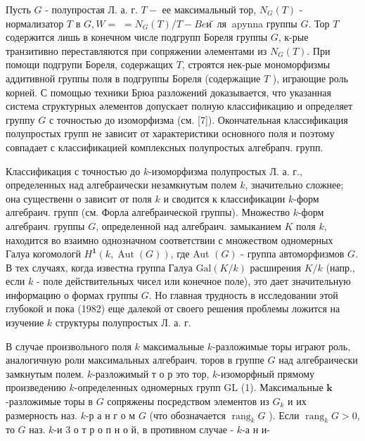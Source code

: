 \documentclass[10pt]{article}
\begin{document}
Пусть $G$ - полупростая Л. а. г. $T-$ ее максимальный тор, $N_{G}(T)$ - нормализатор $T$ в $G, W=$ $=N_{G}(T) / T-B e и ̆ л я ~$ apynna группы $G$. Тор $T$ содержится лишь в конечном числе подгрупп Бореля группы $G$, к-рые транзитивно переставляются при сопряжении әлементами из $N_{G}(T)$. При помощи подгрупи Бореля, содержащих $T$, строятся нек-рые мономорфизмы аддитивной группы поля в подгруппы Бореля (содержащие $T$ ), играющие роль корней. С помощью техники Брюа разложений доказывается, что указанная система структурных әлементов допускает полную классификацию и определяет группу $G$ с точностью до изоморфизма (см. [7]). Окончательная классификация полупростых групп не зависит от характеристики основного поля и поэтому совпадает с классификацией комплексных полупростых алгебрапч. групп.



Классификация с точностью до $k$-изоморфизма полупростых Л. а. г., определенных над алгебраически незамкнутым полем $k$, значительно сложнее; она существенн о зависит от поля $k$ и сводится к классификации $k$-форм алгебраич. групп (см. Форла алгебраической группы). Множество $k$-форм алгебраич. группы $G$, определенной над алгебраич. замыканием $K$ поля $k$, находится во взаимно однозначном соответствии с множеством одномерных Галуа когомологй $H^{\mathbf{1}}(k, \operatorname{Aut}(G))$, где Aut $(G)$ - группа автоморфизмов $G$. В тех случаях, когда известна группа Галуа $\mathrm{Gal}(K / k)$ расширения $K / k$ (напр., если $k$ - поле действительных чисел или конечное поле), это дает значительную информацию о формах группы $G$. Но главная трудность в исследовании этой глубокой и пока (1982) еще далекой от своего решения проблемы ложится на изучение $k$ структуры полупростых Л. а. г.



В случае произвольного поля $k$ максимальные $k$-разложимые торы играют роль, аналогичную роли максимальных алгебраич. торов в группе $G$ над алгебраически замкнутым полем. $k$-разложимый т о р это тор, $k$-изоморфный прямому произведению $k$-определенных одномерных групп GL (1). Максимальные $\boldsymbol{k}$-разложимые торы в $G$ сопряжены посредством элементов из $G_{k}$ и их размерность наз. $k$-р а н г о м $G$ (что обозначается $\operatorname{rang}_{k} G$ ). Если $\operatorname{rang}_{k} G>0$, то $G$ наз. $k$-и 3 о т р о п н о й, в противном случае - $k$-а н и-
\end{document}
